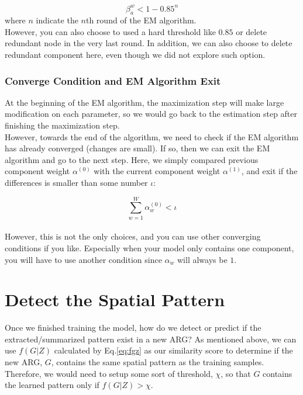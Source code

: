 \begin{equation} 
\beta^w_a < 1 - 0.85^n
\end{equation}
where $n$ indicate the $n$th round of the EM algorithm.\\

However, you can also choose to used a hard threshold like $0.85$ or delete redundant node in the very last round. In addition, we can also choose to delete redundant component here, even though we did not explore such option.

\subsubsection{Converge Condition and EM Algorithm Exit}

At the beginning of the EM algorithm, the maximization step will make large modification on each parameter, so we would go back to the estimation step after finishing the maximization step. \\

However, towards the end of the algorithm, we need to check if the EM algorithm has already converged (changes are small). If so, then we can exit the EM algorithm and go to the next step. Here, we simply compared previous component weight $\alpha^{(0)}$ with the current component weight $\alpha^{(1)}$, and exit if the differences is smaller than some number $\iota$:

\begin{equation} 
\sum^{W}_{w=1}\alpha^{(0)}_w<\iota
\end{equation}\\

However, this is not the only choices, and you can use other converging conditions if you like. Especially when your model only contains one component, you will have to use another condition since $\alpha_w$ will always be $1$.\\

\newpage

\section{Detect the Spatial Pattern}

Once we finished training the model, how do we detect or predict if the extracted/summarized pattern exist in a new ARG? As mentioned above, we can use $f(G|Z)$ calculated by Eq.\ref{eq:fgz} as our similarity score to determine if the new ARG, $G$, contains the same spatial pattern as the training samples. Therefore, we would need to setup some sort of threshold, $\chi$, so that $G$ contains the learned pattern only if $f(G|Z)>\chi$.\\ 

